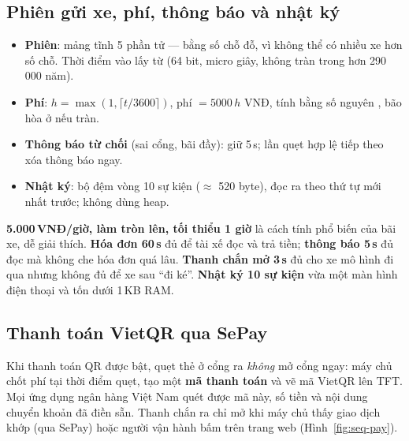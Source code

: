 \subsection{Phiên gửi xe, phí, thông báo và nhật ký}
\begin{itemize}
\item \textbf{Phiên}: mảng tĩnh 5 phần tử — bằng số chỗ đỗ, vì không thể có nhiều xe hơn số chỗ.
  Thời điểm vào lấy từ  (64 bit, micro giây, không tràn trong
  hơn 290\,000 năm).
\item \textbf{Phí}: $h=\max(1,\lceil t/3600\rceil)$, phí $=5000\,h$ VNĐ, tính bằng số
  nguyên , bão hòa ở  nếu tràn.
\item \textbf{Thông báo từ chối} (sai cổng, bãi đầy): giữ 5\,s; lần quẹt hợp lệ tiếp
  theo xóa thông báo ngay.
\item \textbf{Nhật ký}: bộ đệm vòng 10 sự kiện ($\approx$ 520 byte), đọc ra theo thứ tự mới
  nhất trước; không dùng heap.
\end{itemize}

\begin{lydo}
\textbf{5.000\,VNĐ/giờ, làm tròn lên, tối thiểu 1 giờ} là cách tính phổ biến của bãi
xe, dễ giải thích. \textbf{Hóa đơn 60\,s} đủ để tài xế đọc và trả tiền; \textbf{thông
báo 5\,s} đủ đọc mà không che hóa đơn quá lâu. \textbf{Thanh chắn mở 3\,s} đủ cho xe mô
hình đi qua nhưng không đủ để xe sau ``đi ké''. \textbf{Nhật ký 10 sự kiện} vừa một màn
hình điện thoại và tốn dưới 1\,KB RAM.
\end{lydo}

\subsection{Thanh toán VietQR qua SePay}\label{sec:vietqr}
Khi thanh toán QR được bật, quẹt thẻ ở cổng ra \emph{không} mở cổng ngay: máy chủ chốt
phí tại thời điểm quẹt, tạo một \textbf{mã thanh toán} và vẽ mã VietQR lên TFT. Mọi ứng
dụng ngân hàng Việt Nam quét được mã này, số tiền và nội dung chuyển khoản đã điền sẵn.
Thanh chắn ra chỉ mở khi máy chủ thấy giao dịch khớp (qua SePay) hoặc người vận hành bấm
 trên trang web (Hình~\ref{fig:seq-pay}).

